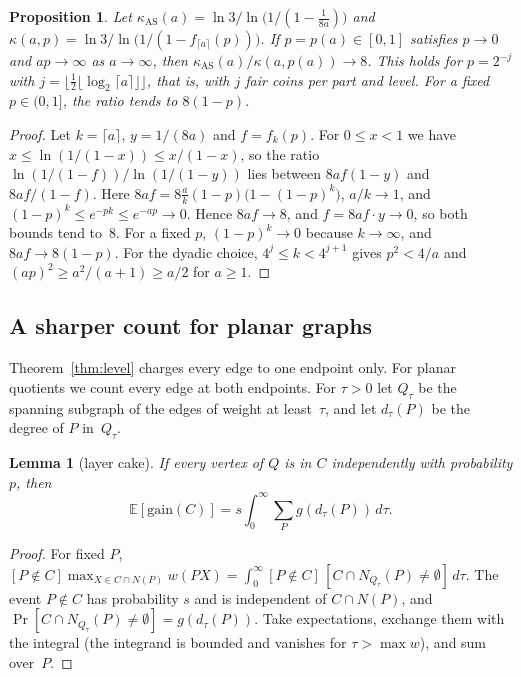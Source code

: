 \documentclass[11pt]{article}
\newtheorem{lemma}[theorem]{Lemma}
\newtheorem{proposition}[theorem]{Proposition}
\theoremstyle{remark}
\newcommand{\E}{\mathbb{E}}
\begin{document}
\begin{proposition}\label{prop:eight}
Let $\kappa_{\mathrm{AS}}(a)=\ln3/\ln\big(1/(1-\frac1{8a})\big)$ and
$\kappa(a,p)=\ln3/\ln\big(1/(1-f_{\lceil a\rceil}(p))\big)$. If $p=p(a)\in[0,1]$ satisfies $p\to0$
and $ap\to\infty$ as $a\to\infty$, then $\kappa_{\mathrm{AS}}(a)/\kappa(a,p(a))\to8$. This holds for
$p=2^{-j}$ with $j=\lfloor\frac12\lfloor\log_2\lceil a\rceil\rfloor\rfloor$, that is, with $j$ fair
coins per part and level. For a fixed $p\in(0,1]$, the ratio tends to $8(1-p)$.
\end{proposition}
\begin{proof}
Let $k=\lceil a\rceil$, $y=1/(8a)$ and $f=f_k(p)$. For $0\le x<1$ we have
$x\le\ln(1/(1-x))\le x/(1-x)$, so the ratio $\ln(1/(1-f))/\ln(1/(1-y))$ lies between $8af(1-y)$ and
$8af/(1-f)$. Here $8af=8\frac ak(1-p)\big(1-(1-p)^k\big)$, $a/k\to1$, and
$(1-p)^k\le e^{-pk}\le e^{-ap}\to0$. Hence $8af\to8$, and $f=8af\cdot y\to0$, so both bounds tend
to~$8$. For a fixed $p$, $(1-p)^k\to0$ because $k\to\infty$, and $8af\to8(1-p)$. For the dyadic
choice, $4^j\le k<4^{j+1}$ gives $p^2<4/a$ and $(ap)^2\ge a^2/(a+1)\ge a/2$ for $a\ge1$.
\end{proof}

\subsection{A sharper count for planar graphs}\label{sec:planar}

Theorem~\ref{thm:level} charges every edge to one endpoint only. For planar quotients we count every
edge at both endpoints. For $\tau>0$ let $Q_\tau$ be the spanning subgraph of the edges of weight at
least~$\tau$, and let $d_\tau(P)$ be the degree of $P$ in~$Q_\tau$.

\begin{lemma}[layer cake]\label{lem:cake}
If every vertex of $Q$ is in $C$ independently with probability $p$, then
\[
  \E[\mathrm{gain}(C)]=s\int_0^\infty\sum_P g(d_\tau(P))\,d\tau.
\]
\end{lemma}
\begin{proof}
For fixed $P$, $[P\notin C]\max_{X\in C\cap N(P)}w(PX)=\int_0^\infty[P\notin C]\,[C\cap N_{Q_\tau}(P)\ne\emptyset]\,d\tau$.
The event $P\notin C$ has probability $s$ and is independent of $C\cap N(P)$, and
$\Pr[C\cap N_{Q_\tau}(P)\ne\emptyset]=g(d_\tau(P))$. Take expectations, exchange them with the
integral (the integrand is bounded and vanishes for $\tau>\max w$), and sum over~$P$.
\end{proof}
\end{document}

